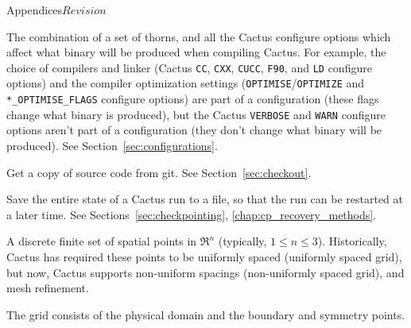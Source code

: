 \begin{cactuspart}{Appendices}{}{$Revision$}
\begin{Lentry}
\item[configuration]
  The combination of a set of thorns, and all the Cactus configure
  options which affect what binary will be produced when compiling
  Cactus.  For example, the choice of compilers and linker (Cactus
  \verb|CC|, \verb|CXX|, \verb|CUCC|, \verb|F90|, and \verb|LD|
  configure options) and the compiler optimization settings
  (\verb|OPTIMISE|/\verb|OPTIMIZE| and \verb|*_OPTIMISE_FLAGS| configure
  options) are part of a configuration (these flags change what binary
  is produced), but the Cactus \verb|VERBOSE| and \verb|WARN| configure
  options aren't part of a configuration (they don't change what binary
  will be produced).
  See Section~\ref{sec:configurations}.
\item[checkout]
  Get a copy of source code from git.  See Section~\ref{sec:checkout}.
\item[checkpoint]
  Save the entire state of a Cactus run to a file, so that the run can be
  restarted at a later time.
  See Sections~\ref{sec:checkpointing}, \ref{chap:cp_recovery_methods}.
\item[computational grid]
  A discrete finite set of spatial points in $\Re^n$
  (typically, $1 \le n \le 3$).
  Historically, Cactus has required these points to be uniformly spaced
  (uniformly spaced grid), but now, Cactus
  supports non-uniform spacings (non-uniformly spaced grid), and mesh refinement.

  The grid consists of the physical domain and the boundary and symmetry
  points.


\end{Lentry}
\end{cactuspart}

